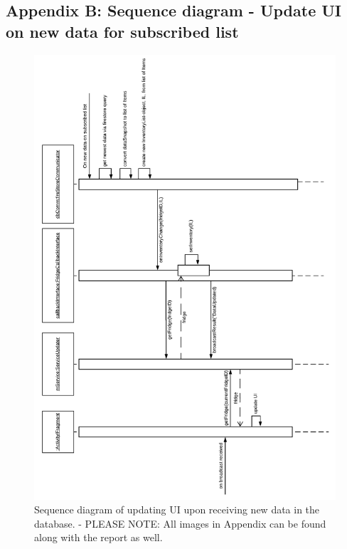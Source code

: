\documentclass[12pt]{article}
\begin{document}
\subsection{Appendix B: Sequence diagram - Update UI on new data for subscribed list}
\begin{figure}[H]
	\centering
	\includegraphics[width=120mm]{Img/APPENDIX B - SD-onNewData.pdf}
	\caption{Sequence diagram of updating UI upon receiving new data in the database. - PLEASE NOTE: All images in Appendix can be found along with the report as well.}
	\label{fig:SD_onNewData}
\end{figure}
\end{document}
